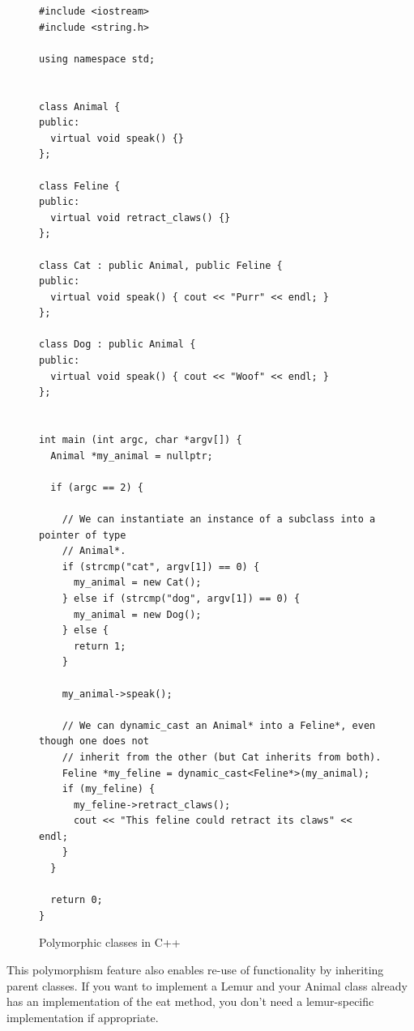 \documentclass[a4paper,11pt,oneside]{report}
\begin{document}
\begin{figure}
\begin{lstlisting}
#include <iostream>
#include <string.h>

using namespace std;


class Animal {
public:
  virtual void speak() {}
};

class Feline {
public:
  virtual void retract_claws() {}
};

class Cat : public Animal, public Feline {
public:
  virtual void speak() { cout << "Purr" << endl; }
};

class Dog : public Animal {
public:
  virtual void speak() { cout << "Woof" << endl; }
};


int main (int argc, char *argv[]) {
  Animal *my_animal = nullptr;

  if (argc == 2) {

    // We can instantiate an instance of a subclass into a pointer of type
    // Animal*.
    if (strcmp("cat", argv[1]) == 0) {
      my_animal = new Cat();
    } else if (strcmp("dog", argv[1]) == 0) {
      my_animal = new Dog();
    } else {
      return 1;
    }

    my_animal->speak();

    // We can dynamic_cast an Animal* into a Feline*, even though one does not
    // inherit from the other (but Cat inherits from both).
    Feline *my_feline = dynamic_cast<Feline*>(my_animal);
    if (my_feline) {
      my_feline->retract_claws();
      cout << "This feline could retract its claws" << endl;
    }
  }

  return 0;
}
\end{lstlisting}
\caption{Polymorphic classes in C++}
\label{classes}

\end{figure}

This polymorphism feature also enables re-use of functionality by inheriting 
parent classes.
If you want to implement a Lemur and your Animal class already has an 
implementation of the eat method,
you don't need a lemur-specific implementation if appropriate. 
\end{document}
